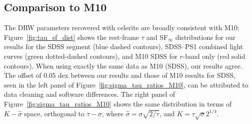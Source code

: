 \documentclass[twocolumn]{aastex62}
\newcommand{\project}[1]{\textsf{#1}}
\begin{document}
\subsection{Comparison to M10}
The DRW parameters recovered with \project{celerite} are  broadly consistent with M10; Figure~\ref{fig:tau_sf_dist} shows the rest-frame  $\tau$ and SF$_{\infty}$ distributions for our results for the SDSS segment (blue dashed contours),  SDSS--PS1 combined light curves (green dotted-dashed contours), and  M10 SDSS for $r$-band only (red solid contours). When using exactly the same data as M10 (SDSS), our results agree. The offset of 0.05 dex  between our results and those of M10 results for SDSS, seen in the left panel of Figure~\ref{fig:sigma_tau_ratios_M10}, can be attributed to data cleaning and software differences. The right panel of Figure~\ref{fig:sigma_tau_ratios_M10} shows the same distribution in terms of $K-\hat{\sigma}$ space, orthogonal to $\tau-\sigma$, where $\hat{\sigma} = \sigma\sqrt{2 / \tau}$, and $K = \tau \sqrt{\sigma} 2^{1/4} $. 


\begin{figure*}
	\caption{Comparison of \project{celerite} fits using only the  SDSS $r$-band segments of S82 quasars ($\sigma_{\mathrm{SDSS}}, \tau_{\mathrm{SDSS}}$) against M10 results for the SDSS $r$ band ($\sigma_{M10}, \tau_{M10}$) object by object. Note that for each ratio, the median-based bias (bottom left corner) is calculated before taking the logarithm. The small offset ($<0.05 $ dex) can be attributed to data cleaning and software differences. See Figure~\ref{fig:tau_sf_dist} for a comparison of rest-frame $\tau$ and SF$_{\infty}$ distributions. This is similar to Figure 3 in M10, except we plot only the $r$-band SDSS results. The right panel shows the comparison in an orthogonal $K-\hat{\sigma}$  space, where $K$ is the direction along the diagonal in the left panel and $\hat{\sigma}$ is perpendicular to the diagonal. For this reason, the right panel has a 10 times smaller scatter along $\hat{\sigma}$ (0.037) than $K$ (0.358).} 
	\label{fig:sigma_tau_ratios_M10}
\end{figure*} 
\end{document}

